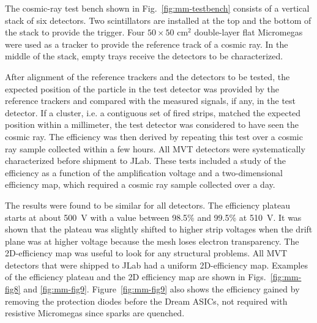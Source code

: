 The cosmic-ray test bench shown in Fig.~\ref{fig:mm-testbench} consists of a vertical stack of six detectors. Two
scintillators are installed at the top and the bottom of the stack to provide the trigger. Four $50 \times 50 \text{ cm}^2$
double-layer flat Micromegas were used as a tracker to provide the reference track of a cosmic ray. In the middle of the
stack, empty trays receive the detectors to be characterized.

After alignment of the reference trackers and the detectors to be tested, the expected position of the particle in the
test detector was provided by the reference trackers and compared with the measured signals, if any, in the test
detector. If a cluster, i.e. a contiguous set of fired strips, matched the expected position within a millimeter, the test
detector was considered to have seen the cosmic ray. The efficiency was then derived by repeating this test over a cosmic
ray sample collected within a few hours. All MVT detectors were systematically characterized before shipment to JLab.
These tests included a study of the efficiency as a function of the amplification voltage and a two-dimensional efficiency
map, which required a cosmic ray sample collected over a day.

The results were found to be similar for all detectors. The efficiency plateau starts at about 500~V with a value between
98.5\% and 99.5\% at 510~V. It was shown that the plateau was slightly shifted to higher strip voltages when the drift
plane was at higher voltage because the mesh loses electron transparency. The 2D-efficiency map was useful to look for
any structural problems. All MVT detectors that were shipped to JLab had a uniform 2D-efficiency map. Examples of the
efficiency plateau and the 2D efficiency map are shown in Figs.~\ref{fig:mm-fig8} and \ref{fig:mm-fig9}.
Figure~\ref{fig:mm-fig9} also shows the efficiency gained by removing the protection diodes before the Dream ASICs,
not required with resistive Micromegas since sparks are quenched.

